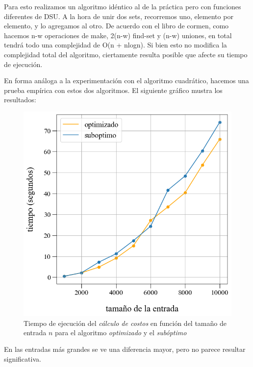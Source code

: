 Para esto realizamos un algoritmo idéntico al de la práctica pero con funciones diferentes de DSU. A la hora de unir dos sets, recorremos uno, elemento por elemento, y lo agregamos al otro. De acuerdo con el libro de cormen, como hacemos n-w operaciones de make, 2(n-w) find-set y (n-w) uniones, en total tendrá todo una complejidad de O(n + nlogn). Si bien esto no modifica la complejidad total del algoritmo, ciertamente resulta posible que afecte su tiempo de ejecución.

En forma análoga a la experimentación con el algoritmo cuadrático, hacemos una prueba empírica con estos dos algoritmos. El siguiente gráfico mustra los resultados:

\begin{figure}[!htbp]
    \includegraphics[scale=0.5, clip]{./files/src/.media/comparacion_DSU.png}
    \caption{Tiempo de ejecución del \textit{cálculo de costos} en función del tamaño de entrada $n$ para el algoritmo \textit{optimizado} y el \textit{subóptimo}}
\end{figure}

En las entradas más grandes se ve una diferencia mayor, pero no parece resultar significativa.